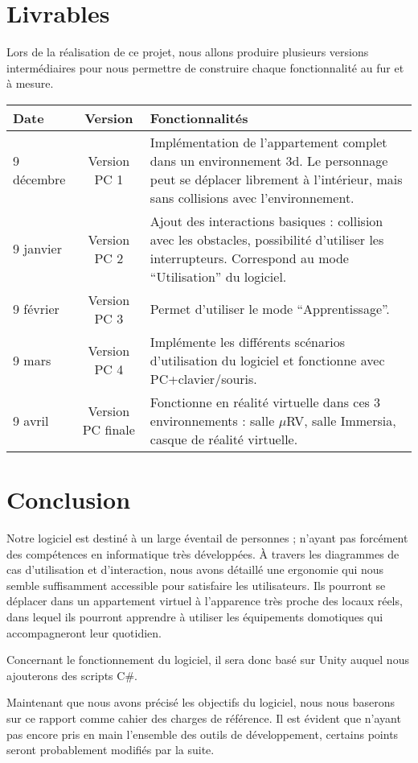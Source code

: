 \section{Livrables}
Lors de la réalisation de ce projet, nous allons produire plusieurs versions intermédiaires pour nous permettre de construire chaque fonctionnalité au fur et à mesure.
\newline

\begin{tabular}{|l|c|p{8cm}|}
  \hline
  Date & Version & Fonctionnalités \\
  \hline
  9 décembre & Version PC 1 & Implémentation de l'appartement complet dans un environnement 3d. Le personnage peut se déplacer librement à l'intérieur, mais sans collisions avec l'environnement. \\
  \hline
  9 janvier & Version PC 2 & Ajout des interactions basiques : collision avec les obstacles, possibilité d'utiliser les interrupteurs. Correspond au mode \enquote{Utilisation} du logiciel. \\
  \hline
  9 février & Version PC 3 & Permet d'utiliser le mode \enquote{Apprentissage}. \\
  \hline
  9 mars & Version PC 4 & Implémente les différents scénarios d'utilisation du logiciel et fonctionne avec PC+clavier/souris. \\
  \hline
  9 avril & Version PC finale & Fonctionne en réalité virtuelle dans ces 3 environnements : salle $\mu$RV, salle Immersia, casque de réalité virtuelle.\\
  \hline
\end{tabular}

\section{Conclusion}
Notre logiciel est destiné à un large éventail de personnes ; n'ayant pas forcément des compétences en informatique très développées.
\`A travers les diagrammes de cas d'utilisation et d'interaction, nous avons détaillé une ergonomie qui nous semble suffisamment accessible pour satisfaire les utilisateurs.
Ils pourront se déplacer dans un appartement virtuel à l'apparence très proche des locaux réels, dans lequel ils pourront apprendre à utiliser les équipements domotiques qui accompagneront leur quotidien.

Concernant le fonctionnement du logiciel, il sera donc basé sur Unity auquel nous ajouterons des scripts C\#.

Maintenant que nous avons précisé les objectifs du logiciel, nous nous baserons sur ce rapport comme cahier des charges de référence. Il est évident que n'ayant pas encore pris en main l'ensemble des outils de développement, certains points seront probablement modifiés par la suite.
